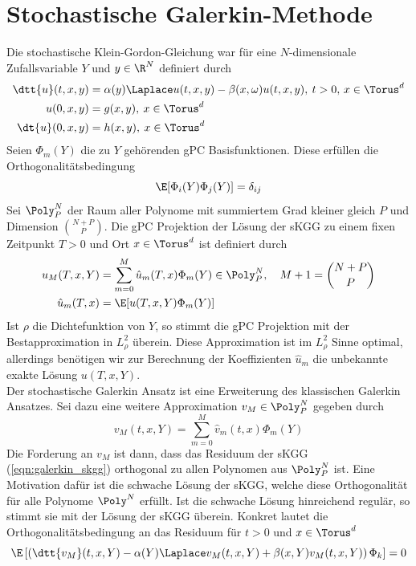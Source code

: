 
\chapter{Stochastische Galerkin-Methode}
Die stochastische Klein-Gordon-Gleichung war für eine $N$-dimensionale Zufallsvariable $Y$ und $y\in\R^N$ definiert durch
\begin{align}
\label{eqn:galerkin_skgg}
\dtt{u}(t,x,y)&=\alpha(y) \Laplace u(t,x,y) - \beta(x,\omega)u(t,x,y), \: t>0, \, x\in \Torus^d\\
u(0,x,y)&=g(x,y), \: x\in \Torus^d\nonumber\\
\dt{u}(0,x,y)&=h(x,y), \: x\in \Torus^d\nonumber
\end{align}
Seien $\Phi_m(Y)$ die zu $Y$ gehörenden gPC Basisfunktionen. Diese erfüllen die Orthogonalitätsbedingung 
\[\E[\Phi_i(Y)\Phi_j(Y)]=\delta_{ij}\] 
Sei $\Poly_P^N$ der Raum aller Polynome mit summiertem Grad kleiner gleich $P$ und Dimension $\binom{N+P}{P}$. Die gPC Projektion der Lösung der sKGG zu einem fixen Zeitpunkt $T>0$ und Ort $x\in\Torus^d$ ist definiert durch
\begin{align*}
u_M(T,x,Y)&=\sum_{m=0}^M\hat{u}_m(T,x)\Phi_m(Y)\in\Poly_P^N,\quad  M+1=\binom{N+P}{P}\\
\hat{u}_m(T,x)&=\E[u(T,x,Y)\Phi_m(Y)]
\end{align*}
Ist $\rho$ die Dichtefunktion von $Y$, so stimmt die gPC Projektion mit der Bestapproximation in $L_\rho^2$ überein. Diese Approximation ist im $L_\rho^2$ Sinne optimal, allerdings benötigen wir zur Berechnung der Koeffizienten $\hat{u}_m$ die unbekannte exakte Lösung $u(T,x,Y)$.\\
Der stochastische Galerkin Ansatz ist eine Erweiterung des klassischen Galerkin Ansatzes. Sei dazu eine weitere Approximation $v_M\in\Poly_P^N$ gegeben durch
\begin{equation}
v_M(t,x,Y)=\sum_{m=0}^M\hat{v}_m(t,x)\Phi_m(Y)
\end{equation}
Die Forderung an $v_M$ ist dann, dass das Residuum der sKGG (\ref{eqn:galerkin_skgg}) orthogonal zu allen Polynomen aus $\Poly_P^N$ ist. Eine Motivation dafür ist die schwache Lösung der sKGG, welche diese Orthogonalität für alle Polynome $\Poly^N$ erfüllt. Ist die schwache Lösung hinreichend regulär, so stimmt sie mit der Lösung der sKGG überein.
Konkret lautet die Orthogonalitätsbedingung an das Residuum für $t>0$ und $x\in\Torus^d$
\begin{equation}
\label{eqn:galerkinOrtho}
\E\left[\left(\dtt{v_M}(t,x,Y)-\alpha(Y)\Laplace v_M(t,x,Y)+\beta(x,Y)v_M(t,x,Y)\right)\Phi_k\right]=0
\end{equation} 
